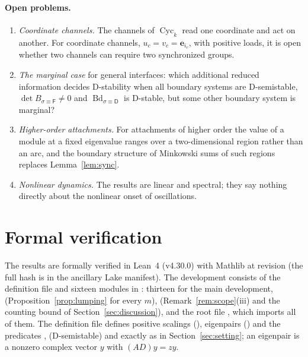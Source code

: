 \documentclass[11pt,a4paper]{article}
\theoremstyle{plain}
\theoremstyle{definition}
\theoremstyle{remark}
\newcommand{\Bd}{\operatorname{Bd}}
\newcommand{\Cyc}{\operatorname{Cyc}}
\newcommand{\be}{\mathbf{e}}
\newcommand{\rF}{\mathsf{F}}
\newcommand{\rD}{\mathsf{D}}
\begin{document}
\paragraph{Open problems.}
\begin{enumerate}[label=(\arabic*)]
  \item \emph{Coordinate channels.} The channels of $\Cyc_k$ read one coordinate and act on
    another. For coordinate channels, $u_c=v_c=\be_{i_c}$, with positive loads, it is open
    whether two channels can require two synchronized groups.
  \item \emph{The marginal case} for general interfaces: which additional reduced
    information decides D-stability when all boundary systems are D-semistable,
    $\det B_{\sigma\equiv\rF}\ne0$ and $\Bd_{\sigma\equiv\rD}$ is D-stable, but some other
    boundary system is marginal?
  \item \emph{Higher-order attachments.} For attachments of higher order the value of a
    module at a fixed eigenvalue ranges over a two-dimensional region rather than an arc,
    and the boundary structure of Minkowski sums of such regions replaces
    Lemma~\ref{lem:sync}.
  \item \emph{Nonlinear dynamics.} The results are linear and spectral; they say nothing
    directly about the nonlinear onset of oscillations.
\end{enumerate}

\section{Formal verification}\label{sec:lean}

The results are formally verified in Lean~4 (v4.30.0) with Mathlib at revision
 (the full hash is in the ancillary Lake manifest). The development consists
of the definition file  and sixteen modules in
: thirteen for the main development, 
(Proposition~\ref{prop:lumping} for every $m$),  (Remark~\ref{rem:scope}(iii)
and the counting bound of Section~\ref{sec:discussion}), and the root file ,
which imports all of them. The definition file defines positive scalings
(), eigenpairs () and the predicates ,
 (D-semistable) and  exactly as in
Section~\ref{sec:setting}; an eigenpair is a nonzero complex vector $y$ with $(AD)y=zy$.
\end{document}
